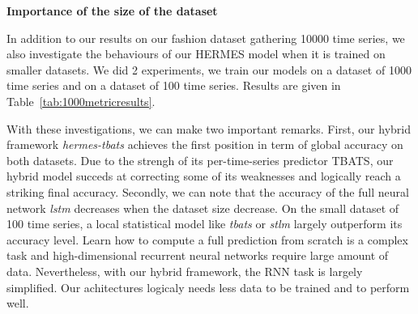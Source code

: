 \documentclass{article} %
\newcommand{\predictor}{\mathrm{RNN}_p}
\newcommand{\classifier}{\mathrm{RNN}_c}
\begin{document}


\textbf{Importance of the size of the dataset}

In addition to our results on our fashion dataset gathering 10000 time series, we also investigate the behaviours of our HERMES model when it is trained on smaller datasets. We did 2 experiments, we train our models on a dataset of 1000 time series and on a dataset of 100 time series. Results are given in Table~\ref{tab:1000metricresults}.

With these investigations, we can make two important remarks. First, our hybrid framework \textit{hermes-tbats} achieves the first position in term of global accuracy on both datasets. Due to the strengh of its per-time-series predictor TBATS, our hybrid model succeds at correcting some of its weaknesses and logically reach a striking final accuracy. Secondly, we can note that the accuracy of the full neural network \textit{lstm} decreases when the dataset size decrease. On the small dataset of 100 time series, a local statistical model like \textit{tbats} or \textit{stlm} largely outperform its accuracy level. Learn how to compute a full prediction from scratch is a complex task and high-dimensional recurrent neural networks require  large amount of data. Nevertheless, with our hybrid framework, the RNN task is largely simplified. Our achitectures logicaly needs less data to be trained and to perform well.
\end{document}
